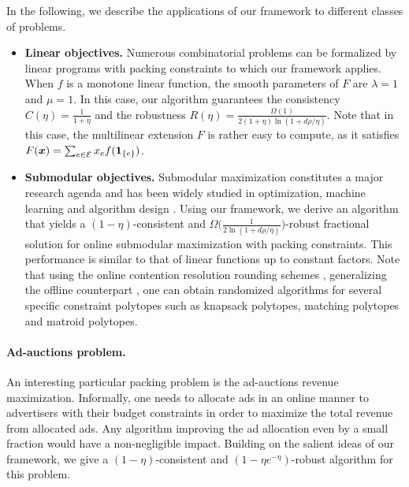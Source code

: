 In the following, we describe the applications of our framework to different classes of problems.
\begin{itemize}
\item \textbf{Linear objectives.} 
Numerous combinatorial problems can be formalized by linear programs with packing constraints
to which our framework applies.  
When  $f$ is  a monotone linear function, the smooth parameters of $F$ are
$\lambda = 1$ and $\mu = 1$. In this case, our algorithm guarantees the consistency $C(\eta) = \frac{1}{1 + \eta}$
and the robustness $R(\eta) =  \frac{\Omega(1)}{2(1 + \eta)\ln(1+ d\rho/\eta)}$. Note that in this case, the multilinear extension $F$ is rather easy to compute, as it satisfies $F(\bm{x}) = \sum_{e\in\cal E} x_e f(\bm{1}_{\{e\}})$.
\item
\textbf{Submodular objectives.}
Submodular maximization constitutes a major research agenda and has been widely studied 
in optimization, machine learning \cite{Bachothers13:Learning-with,KrauseGolovin14:Submodular-Function,BianLevy17:Non-monotone-Continuous} 
and algorithm design \cite{FeldmanNaor11:A-unified-continuous,BuchbinderFeldman15:A-tight-linear}.
Using our framework, we derive an algorithm that yields a $(1 - \eta)$-consistent
and $\Omega \bigl( \frac{1}{2\ln(1+ d\rho/\eta)} \bigr)$-robust fractional solution for online submodular maximization 
with packing constraints. This performance is similar to that of linear functions up to constant factors. 
Note that using the online contention resolution rounding schemes \cite{FeldmanSvensson16:Online-contention},
generalizing the offline counterpart \cite{ChekuriVondrak14:Submodular-function}, 
one can obtain randomized algorithms for several specific constraint polytopes such as knapsack polytopes, 
matching polytopes and matroid polytopes. 
\end{itemize}

\paragraph{Ad-auctions problem.} 
An interesting particular packing problem is the ad-auctions revenue maximization.  
Informally, one needs to allocate ads in an online manner to advertisers with their budget constraints 
in order to maximize the total revenue from allocated ads. Any algorithm improving the ad allocation even by a small fraction 
would have a non-negligible impact. Building on the salient ideas of our framework, we give 
a $(1-\eta)$-consistent and $(1 - \eta e^{-\eta})$-robust algorithm for this problem. 
 
